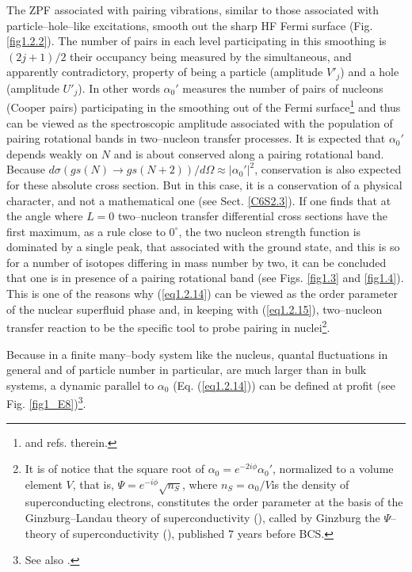 The ZPF associated with pairing vibrations, similar to those associated with particle--hole--like excitations,  smooth out the sharp HF Fermi surface (Fig. \ref{fig1.2.2}). The number of pairs in each level participating in this smoothing is $(2j+1)/2$ their occupancy being measured by the simultaneous, and apparently contradictory, property of being a particle (amplitude $V'_j$) and a hole (amplitude $U'_j$). In other words $\alpha_0'$ measures the number of pairs of nucleons (Cooper pairs) participating in the smoothing out of the Fermi surface\footnote{\cite{Schrieffer:64,Potel:17} and refs. therein.} and thus can be viewed as the spectroscopic amplitude associated with the population of pairing rotational bands in two--nucleon transfer processes. It is expected that $\alpha_0'$ depends weakly on $N$ and is about conserved along a pairing rotational band. Because $d\sigma(gs(N)\rightarrow gs(N+2))/d\Omega\approx|\alpha_0'|^2$, conservation is also expected for these absolute cross section. But in this case, it is a conservation of a physical character, and not a mathematical one (see Sect. \ref{C6S2.3}). If one finds that at the angle where $L=0$ two--nucleon transfer differential cross sections have the first maximum, as a rule close to $0^\circ$, the two nucleon strength function is dominated by a single peak, that associated with the ground state, and this is so for a number of isotopes differing in mass number by two, it can be concluded that one is in presence of a pairing rotational band (see Figs. \ref{fig1.3} and \ref{fig1.4}). This is one of the reasons why (\ref{eq1.2.14}) can be viewed as the order parameter of the nuclear superfluid phase and, in keeping with (\ref{eq1.2.15}), two--nucleon transfer reaction to be the specific tool to probe pairing in nuclei\footnote{It is of notice that the square root of $\alpha_0=e^{-2i\phi}\alpha_0'$, normalized to a volume element $V$, that is, $\Psi=e^{-i\phi}\sqrt{n_S}$, where $n_S=\alpha_0/V$is the density of superconducting electrons, constitutes the order parameter at the basis of the Ginzburg--Landau theory of superconductivity (\cite{Ginzburg:50}), called by Ginzburg the $\Psi$--theory of superconductivity (\cite{Ginzburg:04}), published 7 years before BCS.}.

Because in a finite many--body system like the nucleus, quantal fluctuations in general and of particle number in particular, are much larger than in bulk systems, a dynamic parallel to $\alpha_0$ (Eq. (\ref{eq1.2.14})) can be defined at profit (see Fig. \ref{fig1_E8})\footnote{See also \cite{Potel:17}.}. 
